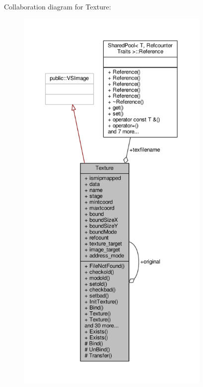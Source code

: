 Collaboration diagram for Texture\+:
\nopagebreak
\begin{figure}[H]
\begin{center}
\leavevmode
\includegraphics[height=550pt]{de/d5c/classTexture__coll__graph}
\end{center}
\end{figure}
